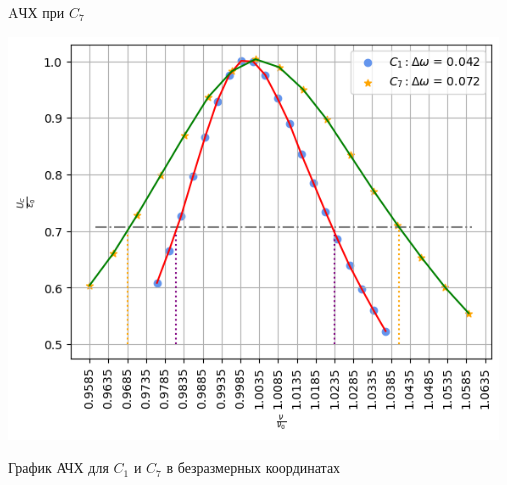 \begin{table}[h!]
\begin{minipage}{0.3\linewidth}
        \caption{AЧХ при $C_7$}
    \end{minipage}
    \begin{minipage}{0.7\textwidth}
        \centering
        \includegraphics[width=13cm]{./images/plot2.png}
        \caption*{График АЧХ для $C_1$ и $C_7$ в безразмерных координатах}
    \end{minipage}
\end{table}

